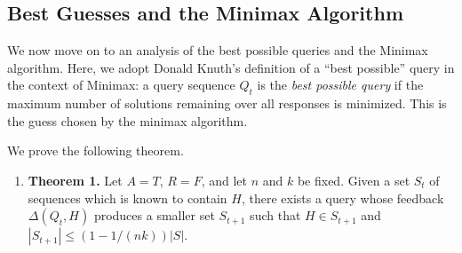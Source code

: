 \documentclass[12pt, a4paper]{article}
\begin{document}
\subsection{Best Guesses and the Minimax Algorithm}
We now move on to an analysis of the best possible queries and the Minimax algorithm. Here, we adopt Donald Knuth's definition of a ``best possible'' query in the context of Minimax\cite{DK76}: a query sequence $Q_t$ is the \textit{best possible query} if the maximum number of solutions remaining over all responses is minimized. This is the guess chosen by the minimax algorithm.

We prove the following theorem.
\begin{enumerate}[label=]
	\item\textbf{Theorem 1.} Let $A=T$, $R = F$, and let $n$ and $k$ be fixed. Given a set $S_{t}$ of sequences which is known to contain $H$, there exists a query whose feedback $\Delta(Q_t, H)$ produces a smaller set $S_{t+1}$ such that $H\in S_{t+1}$ and $|S_{t+1}|\le (1-1/(nk))|S|$.	
\end{enumerate}
\end{document}

